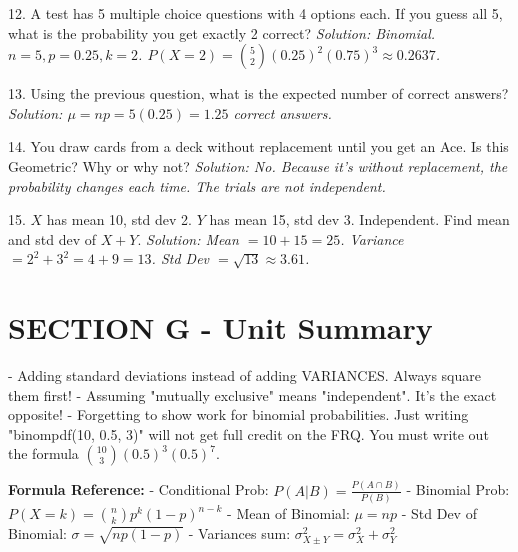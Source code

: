 \begin{workbookbox}
12. A test has 5 multiple choice questions with 4 options each. If you guess all 5, what is the probability you get exactly 2 correct?
\textit{Solution: Binomial. $n=5, p=0.25, k=2$. $P(X=2) = \binom{5}{2}(0.25)^2(0.75)^3 \approx 0.2637$.}

13. Using the previous question, what is the expected number of correct answers?
\textit{Solution: $\mu = np = 5(0.25) = 1.25$ correct answers.}

14. You draw cards from a deck without replacement until you get an Ace. Is this Geometric? Why or why not?
\textit{Solution: No. Because it's without replacement, the probability changes each time. The trials are not independent.}

15. $X$ has mean 10, std dev 2. $Y$ has mean 15, std dev 3. Independent. Find mean and std dev of $X+Y$.
\textit{Solution: Mean $= 10+15 = 25$. Variance $= 2^2 + 3^2 = 4 + 9 = 13$. Std Dev $= \sqrt{13} \approx 3.61$.}
\end{workbookbox}

\section{SECTION G - Unit Summary}
\begin{trapbox}
- Adding standard deviations instead of adding VARIANCES. Always square them first!
- Assuming "mutually exclusive" means "independent". It's the exact opposite!
- Forgetting to show work for binomial probabilities. Just writing "binompdf(10, 0.5, 3)" will not get full credit on the FRQ. You must write out the formula $\binom{10}{3}(0.5)^3(0.5)^7$.
\end{trapbox}

\textbf{Formula Reference:}
- Conditional Prob: $P(A | B) = \frac{P(A \cap B)}{P(B)}$
- Binomial Prob: $P(X=k) = \binom{n}{k} p^k (1-p)^{n-k}$
- Mean of Binomial: $\mu = np$
- Std Dev of Binomial: $\sigma = \sqrt{np(1-p)}$
- Variances sum: $\sigma^2_{X \pm Y} = \sigma^2_X + \sigma^2_Y$

